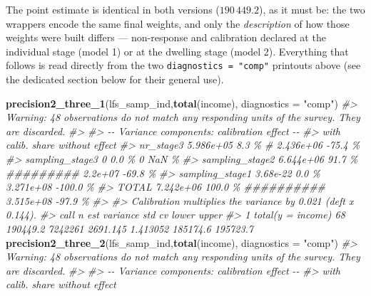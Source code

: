\documentclass[
]{article}
\newenvironment{Shaded}{\begin{snugshade}}{\end{snugshade}}
\newcommand{\AttributeTok}[1]{\textcolor[rgb]{0.13,0.29,0.53}{#1}}
\newcommand{\CommentTok}[1]{\textcolor[rgb]{0.56,0.35,0.01}{\textit{#1}}}
\newcommand{\FunctionTok}[1]{\textcolor[rgb]{0.13,0.29,0.53}{\textbf{#1}}}
\newcommand{\NormalTok}[1]{#1}
\newcommand{\StringTok}[1]{\textcolor[rgb]{0.31,0.60,0.02}{#1}}
\begin{document}
The point estimate is identical in both versions (\(190\,449.2\)), as it
must be: the two wrappers encode the same final weights, and only the
\emph{description} of how those weights were built differs ---
non-response and calibration declared at the individual stage (model 1)
or at the dwelling stage (model 2). Everything that follows is read
directly from the two \texttt{diagnostics\ =\ "comp"} printouts above
(see the dedicated section below for their general use).

\begin{Shaded}
\begin{Highlighting}[]
\FunctionTok{precision2\_three\_1}\NormalTok{(lfs\_samp\_ind,}\FunctionTok{total}\NormalTok{(income), }\AttributeTok{diagnostics =} \StringTok{"comp"}\NormalTok{)}
\CommentTok{\#\textgreater{} Warning: 48 observations do not match any responding units of the survey. They are discarded.}
\CommentTok{\#\textgreater{} }
\CommentTok{\#\textgreater{} {-}{-} Variance components: calibration effect {-}{-}}
\CommentTok{\#\textgreater{}                       with calib.     share                     without     effect}
\CommentTok{\#\textgreater{}   nr\_stage3             5.986e+05    8.3 \%  \#                2.436e+06     {-}75.4 \%}
\CommentTok{\#\textgreater{}   sampling\_stage3               0    0.0 \%                           0       NaN \%}
\CommentTok{\#\textgreater{}   sampling\_stage2       6.644e+06   91.7 \%  \#\#\#\#\#\#\#\#\#          2.2e+07     {-}69.8 \%}
\CommentTok{\#\textgreater{}   sampling\_stage1        3.68e{-}22    0.0 \%                   3.271e+08    {-}100.0 \%}
\CommentTok{\#\textgreater{}   TOTAL                 7.242e+06  100.0 \%  \#\#\#\#\#\#\#\#\#\#       3.515e+08     {-}97.9 \%}
\CommentTok{\#\textgreater{} }
\CommentTok{\#\textgreater{}   Calibration multiplies the variance by 0.021 (deft x 0.144).}
\CommentTok{\#\textgreater{}                call  n      est variance      std       cv    lower    upper}
\CommentTok{\#\textgreater{} 1 total(y = income) 68 190449.2  7242261 2691.145 1.413052 185174.6 195723.7}
\FunctionTok{precision2\_three\_2}\NormalTok{(lfs\_samp\_ind,}\FunctionTok{total}\NormalTok{(income), }\AttributeTok{diagnostics =} \StringTok{"comp"}\NormalTok{)}
\CommentTok{\#\textgreater{} Warning: 48 observations do not match any responding units of the survey. They are discarded.}
\CommentTok{\#\textgreater{} }
\CommentTok{\#\textgreater{} {-}{-} Variance components: calibration effect {-}{-}}
\CommentTok{\#\textgreater{}                       with calib.     share                     without     effect}

\end{Highlighting}
\end{Shaded}
\end{document}
